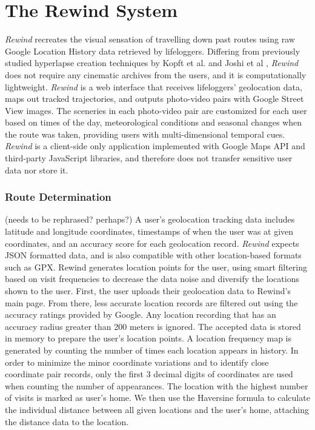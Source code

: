 \documentclass{sigchi}
\begin{document}
\section{The Rewind System}
\textit{Rewind} recreates the visual sensation of travelling down past routes using raw Google Location History data retrieved by lifeloggers. Differing from previously studied hyperlapse creation techniques by Kopft et al. and Joshi et al \cite{opf:2014:FHV:2601097.2601195, Joshi:2015:RHC:2809654.2766954}, \textit{Rewind} does not require any cinematic archives from the users, and it is computationally lightweight. \textit{Rewind} is a web interface that receives lifeloggers' geolocation data, maps out tracked trajectories, and outputs photo-video pairs with Google Street View images. The sceneries in each photo-video pair are customized for each user based on times of the day, meteorological conditions and seasonal changes when the route was taken, providing users with multi-dimensional temporal cues. \textit{Rewind} is a client-side only application implemented with Google Maps API and third-party JavaScript libraries, and therefore does not transfer sensitive user data nor store it.

\subsubsection{Route Determination} (needs to be rephrased? perhaps?)
A user's geolocation tracking data includes latitude and longitude coordinates, timestamps of when the user was at given coordinates, and an accuracy score for each geolocation record. \textit{Rewind} expects JSON formatted data, and is also compatible with other location-based formats such as GPX. Rewind generates location points for the user, using smart filtering based on visit frequencies to decrease the data noise and diversify the locations shown to the user. First, the user uploads their geolocation data to Rewind's main page. From there, less accurate location records are filtered out using the accuracy ratings provided by Google. Any location recording that has an accuracy radius greater than 200 meters is ignored. The accepted data is stored in memory to prepare the user's location points. A location frequency map is generated by counting the number of times each location appears in history. In order to minimize the minor coordinate variations and to identify close coordinate pair records, only the first 3 decimal digits of coordinates are used when counting the number of appearances. The location with the highest number of visits is marked as user's home. We then use the Haversine formula to calculate the individual distance between all given locations and the user's home, attaching the distance data to the location.
\end{document}
